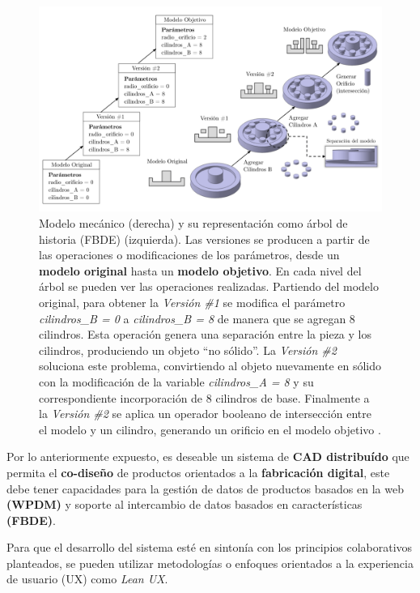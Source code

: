 \begin{figure}[ht]
\includegraphics[width=16cm]{Img/WEB/de-fin.png}
\centering
\caption{\footnotesize{ Modelo mecánico (derecha) y su representación como árbol de historia (FBDE) (izquierda). Las versiones se producen a partir de las operaciones o modificaciones de los parámetros, desde un \textbf{modelo original} hasta un \textbf{modelo objetivo}. En cada nivel del árbol se pueden ver las operaciones realizadas.  Partiendo del modelo original, para obtener la \textit{Versión \#1} se modifica el parámetro \textit{cilindros\_B = 0} a \textit{cilindros\_B = 8} de manera que se agregan 8 cilindros. Esta operación genera una separación entre la pieza y los cilindros, produciendo un objeto ``no sólido''. La \textit{Versión \#2} soluciona este problema, convirtiendo al objeto nuevamente en sólido con la modificación de la variable \textit{cilindros\_A = 8} y su correspondiente incorporación de 8 cilindros de base. Finalmente a la \textit{Versión \#2} se aplica un operador booleano de  intersección entre el modelo y un cilindro, generando un orificio en el modelo objetivo 
\citep{Kwon2015}. }}
\label{fig:de2}
\end{figure}



Por lo anteriormente expuesto, es deseable un sistema de \textbf{CAD distribuído} que permita el \textbf{co-diseño} de productos orientados a la \textbf{fabricación digital}, este debe tener capacidades para la  gestión de datos de productos basados en la web \textbf{(WPDM)} y soporte al intercambio de datos basados en características \textbf{(FBDE)}.

Para que el desarrollo del sistema esté en sintonía con los principios colaborativos planteados, se pueden utilizar metodologías o enfoques orientados a la experiencia de usuario (UX) como \textit{Lean UX}.  

